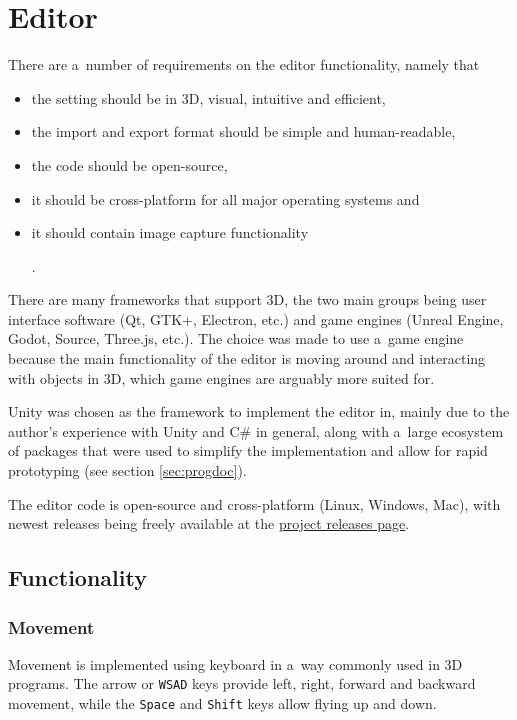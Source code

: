 \chapter{Editor}\label{sec:editor}
There are a~number of requirements on the editor functionality, namely that
\begin{itemize}
	\item the setting should be in 3D, visual, intuitive and efficient,
	\item the import and export format should be simple and human-readable,
	\item the code should be open-source,
	\item it should be cross-platform for all major operating systems and
	\item it should contain image capture functionality.
\end{itemize}

There are many frameworks that support 3D, the two main groups being user interface software (Qt, GTK+, Electron, etc.) and game engines (Unreal Engine, Godot, Source, Three.js, etc.).
The choice was made to use a~game engine because the main functionality of the editor is moving around and interacting with objects in 3D, which game engines are arguably more suited for.

Unity was chosen as the framework to implement the editor in, mainly due to the author's experience with Unity and C\# in general, along with a~large ecosystem of packages that were used to simplify the implementation and allow for rapid prototyping (see section \ref{sec:progdoc}).

The editor code is open-source and cross-platform (Linux, Windows, Mac), with newest releases being freely available at the \href{https://github.com/Climber-Tools/Cled/releases}{project releases page}.

\section{Functionality}

\subsection{Movement}
Movement is implemented using keyboard in a~way commonly used in 3D programs.
The arrow or \verb|WSAD| keys provide left, right, forward and backward movement, while the \verb|Space| and \verb|Shift| keys allow flying up and down.

